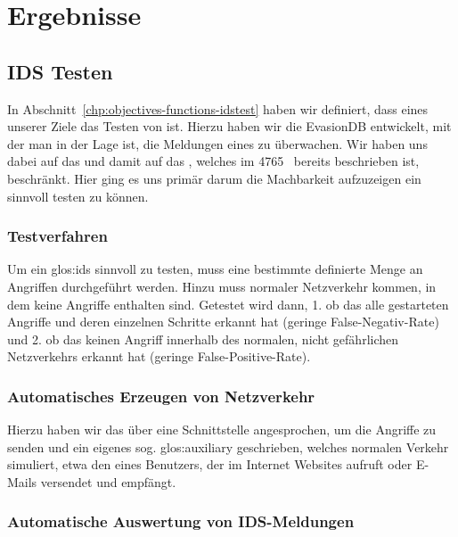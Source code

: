 \chapter{Ergebnisse}
\label{chp:conclusion}
\authors{\DE \and \LM}{\MW \and \DH \and \HM}

\section{IDS Testen}
In Abschnitt~\ref{chp:objectives-functions-idstest} haben wir definiert, dass
eines unserer Ziele das Testen von  ist. Hierzu haben
wir die EvasionDB entwickelt, mit der man in der Lage ist, die
Meldungen eines  zu überwachen. Wir haben uns dabei
auf das   und damit auf das
, welches im  4765~\cite{rfc-4765} bereits beschrieben ist,
beschränkt. Hier ging es uns primär darum die Machbarkeit aufzuzeigen
ein  sinnvoll testen zu können.


\subsection{Testverfahren}

Um ein \gls{glos:ids} sinnvoll zu testen, muss eine bestimmte
definierte Menge an Angriffen durchgeführt werden. Hinzu muss normaler
Netzverkehr kommen, in dem keine Angriffe enthalten sind. Getestet
wird dann, 1. ob das  alle gestarteten Angriffe und deren
einzelnen Schritte erkannt hat (geringe False-Negativ-Rate) und 2. ob
das  keinen Angriff innerhalb des normalen, nicht gefährlichen
Netzverkehrs erkannt hat (geringe False-Positive-Rate).


\subsection{Automatisches Erzeugen von Netzverkehr}

Hierzu haben wir das  über eine Schnittstelle
angesprochen, um die Angriffe zu senden und ein eigenes
sog. \Gls{glos:auxiliary} geschrieben, welches normalen Verkehr simuliert, etwa
den eines Benutzers, der im Internet Websites aufruft oder E-Mails
versendet und empfängt.


\subsection{Automatische Auswertung von IDS-Meldungen}

